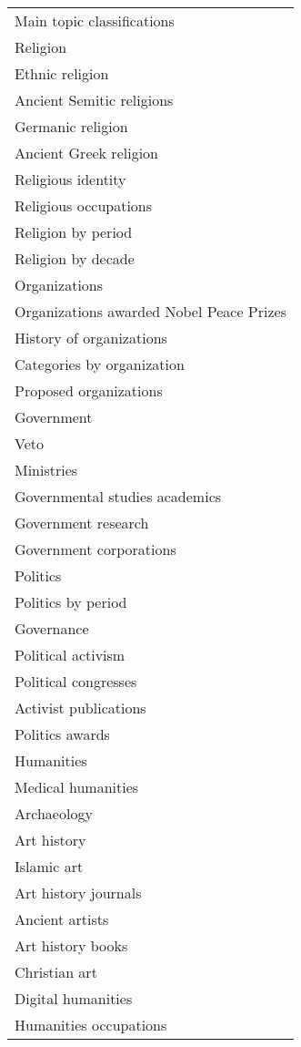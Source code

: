 \begin{table*}[h]
\centering
\begin{minipage}{0.48\textwidth}
\centering
\begin{tabular}{|l|}
\hline
Main topic classifications \\
Religion \\
Ethnic religion \\
Ancient Semitic religions \\
Germanic religion \\
Ancient Greek religion \\
Religious identity \\
Religious occupations \\
Religion by period \\
Religion by decade \\
Organizations \\
Organizations awarded Nobel Peace Prizes \\
History of organizations \\
Categories by organization \\
Proposed organizations \\
Government \\
Veto \\
Ministries \\
Governmental studies academics \\
Government research \\
Government corporations \\
Politics \\
Politics by period \\
Governance \\
Political activism \\
Political congresses \\
Activist publications \\
Politics awards \\
Humanities \\
Medical humanities \\
Archaeology \\
Art history \\
Islamic art \\
Art history journals \\
Ancient artists \\
Art history books \\
Christian art \\
Digital humanities \\
Humanities occupations \\

\end{tabular}
\end{minipage}
\end{table*}
